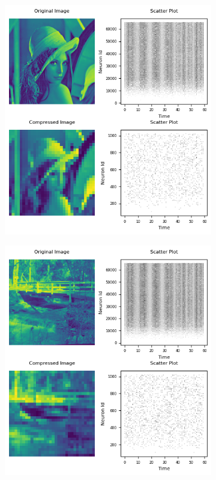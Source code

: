 \documentclass[12pt]{article}
\begin{document}
\begin{figure}[H]
\begin{subfigure}[b]{0.45\textwidth}
  \end{subfigure}
  \\[\smallskipamount]
  \begin{subfigure}[b]{0.45\textwidth}
    \includegraphics[width=\textwidth]{Figs/p_lena.png}
  \end{subfigure}
  \hfill
  \begin{subfigure}[b]{0.45\textwidth}
    \includegraphics[width=\textwidth]{Figs/p_bridge.png}

\end{subfigure}
\end{figure}
\end{document}

